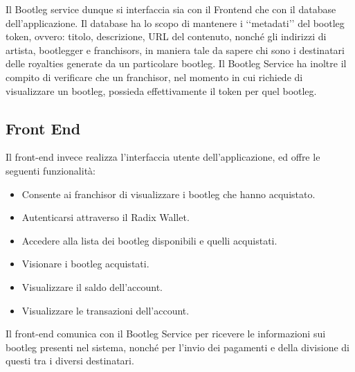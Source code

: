 Il Bootleg service dunque si interfaccia sia con il Frontend che con il database dell'applicazione. Il database ha lo scopo di mantenere i ‘‘metadati’’ del bootleg token, ovvero: titolo, descrizione, URL del contenuto, nonché gli indirizzi di artista, bootlegger e franchisors, in maniera tale da sapere chi sono i destinatari delle royalties generate da un particolare bootleg. Il Bootleg Service ha inoltre il compito di verificare che un franchisor, nel momento in cui richiede di visualizzare un bootleg, possieda effettivamente il token per quel bootleg.

\subsection{Front End}

Il front-end invece realizza l'interfaccia utente dell'applicazione, ed offre le seguenti funzionalità:
\begin{itemize}
    \item Consente ai franchisor di visualizzare i bootleg che hanno acquistato.
    \item Autenticarsi attraverso il Radix Wallet.
    \item Accedere alla lista dei bootleg disponibili e quelli acquistati.
    \item Visionare i bootleg acquistati.
    \item Visualizzare il saldo dell'account.
    \item Visualizzare le transazioni dell'account.
\end{itemize}

Il front-end comunica con il Bootleg Service per ricevere le informazioni sui bootleg presenti nel sistema, nonché per l'invio dei pagamenti e della divisione di questi tra i diversi destinatari.